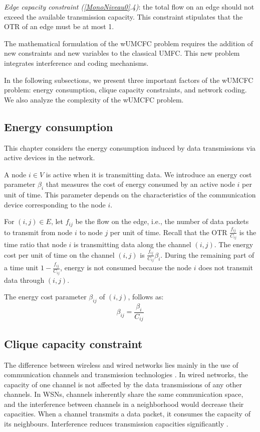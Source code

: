 \textit{Edge capacity constraint (\ref{MonoNiveau0}.4)}:  the total flow on an edge should not exceed the available transmission capacity. This constraint stipulates that the OTR of an edge must be at most 1.

The mathematical formulation of the wUMCFC problem requires the addition of new constraints and new variables to the classical UMFC. This new problem integrates interference and coding mechanisms.

In the following subsections, we present three important factors of the wUMCFC problem: energy consumption, clique capacity constraints, and network coding. We also analyze the complexity of the wUMCFC problem.


\subsection{Energy consumption}
\label{sec.energy}

This chapter considers the energy consumption induced by data transmissions via active devices in the network.

 A node \(i \in V\) is active when it is transmitting data. We introduce an energy cost parameter \(\beta_{i}\) that measures the cost of energy consumed by an active node \(i\) per unit of time. This parameter depends on the characteristics of the communication device corresponding to the node \(i \).

For \((i,j) \in E\), let \(f_{ij}\) be the flow on the edge, i.e., the number of data packets to transmit from node \(i\) to node \(j\) per unit of time. Recall that the OTR \(\frac{f_{ij}}{C_{ij}}\) is the time ratio that node \(i\) is transmitting data along the channel \((i,j)\). The energy cost per unit of time on the channel \((i,j)\) is \( \frac{f_{ij}}{C_{ij}} \beta_i\). During the remaining part of a time unit \(1-\frac{f_{ij}}{C_{ij}}\), energy is not consumed because the node \(i\) does not transmit data through \((i,j)\). 

The energy cost parameter \(\beta_{ij}\) of \((i,j)\), follows as:
\begin{equation}
    \beta_{ij} = \frac{ \beta_i}{C_{ij}}
\end{equation}

\subsection{Clique capacity constraint}
\label{sec1.sub1}
   The difference between wireless and wired networks lies mainly in the use of communication channels and transmission technologies \cite{yang2005}. In wired networks, the capacity of one channel is not affected by the data transmissions of any other channels. In WSNs, channels inherently share the same communication space, and the interference between channels in a neighborhood would decrease their capacities. When a channel transmits a data packet, it consumes the capacity of its neighbours. Interference reduces transmission capacities significantly \cite{jain2005impact}.  
   
